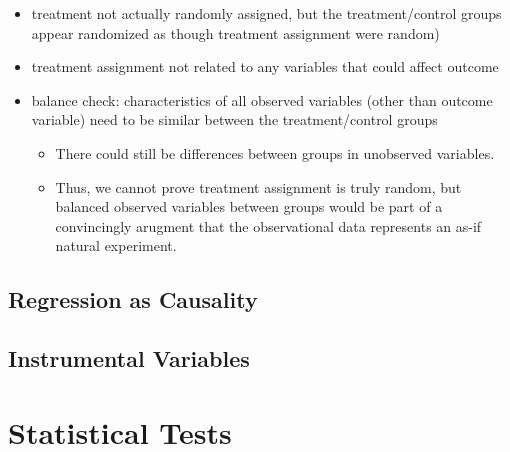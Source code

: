 \documentclass[]{book}
\providecommand{\tightlist}{%
  \setlength{\itemsep}{0pt}\setlength{\parskip}{0pt}}
\begin{document}
\begin{itemize}
\begin{enumerate}
    \begin{itemize}
    \tightlist
    \item
      treatment not actually randomly assigned, but the treatment/control groups appear randomized as though treatment assignment were random)
    \item
      treatment assignment not related to any variables that could affect outcome
    \item
      balance check: characteristics of all observed variables (other than outcome variable) need to be similar between the treatment/control groups

      \begin{itemize}
      \tightlist
      \item
        There could still be differences between groups in unobserved variables.
      \item
        Thus, we cannot prove treatment assignment is truly random, but balanced observed variables between groups would be part of a convincingly arugment that the observational data represents an as-if natural experiment.
      \end{itemize}
    \end{itemize}
  \end{enumerate}
\end{itemize}

\hypertarget{regression-as-causality}{%
\subsection{Regression as Causality}\label{regression-as-causality}}

\hypertarget{instrumental-variables}{%
\subsection{Instrumental Variables}\label{instrumental-variables}}

\hypertarget{stat}{%
\section{Statistical Tests}\label{stat}}
\end{document}
